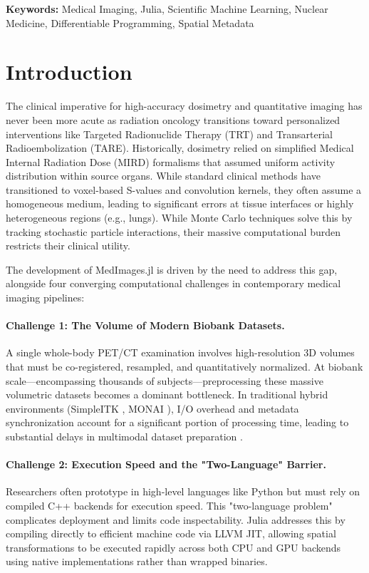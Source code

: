 \documentclass[10pt,letterpaper]{article}
\begin{document}
\textbf{Keywords:} Medical Imaging, Julia, Scientific Machine Learning, Nuclear Medicine, Differentiable Programming, Spatial Metadata

\section{Introduction}

The clinical imperative for high-accuracy dosimetry and quantitative imaging has never been more acute as radiation oncology transitions toward personalized interventions like Targeted Radionuclide Therapy (TRT) and Transarterial Radioembolization (TARE). Historically, dosimetry relied on simplified Medical Internal Radiation Dose (MIRD) formalisms that assumed uniform activity distribution within source organs. While standard clinical methods have transitioned to voxel-based S-values and convolution kernels, they often assume a homogeneous medium, leading to significant errors at tissue interfaces or highly heterogeneous regions (e.g., lungs). While Monte Carlo techniques solve this by tracking stochastic particle interactions, their massive computational burden restricts their clinical utility.

The development of MedImages.jl is driven by the need to address this gap, alongside four converging computational challenges in contemporary medical imaging pipelines:

\paragraph{Challenge 1: The Volume of Modern Biobank Datasets.}
A single whole-body PET/CT examination involves high-resolution 3D volumes that must be co-registered, resampled, and quantitatively normalized. At biobank scale---encompassing thousands of subjects---preprocessing these massive volumetric datasets becomes a dominant bottleneck. In traditional hybrid environments (SimpleITK \cite{LowekampChen2013}, MONAI \cite{CardosoLi2022}), I/O overhead and metadata synchronization account for a significant portion of processing time, leading to substantial delays in multimodal dataset preparation \cite{Dexl_2025}.

\paragraph{Challenge 2: Execution Speed and the "Two-Language" Barrier.}
Researchers often prototype in high-level languages like Python but must rely on compiled C++ backends for execution speed. This "two-language problem" complicates deployment and limits code inspectability. Julia \cite{BezansonChen2018} addresses this by compiling directly to efficient machine code via LLVM JIT, allowing spatial transformations to be executed rapidly across both CPU and GPU backends using native implementations rather than wrapped binaries.
\end{document}

